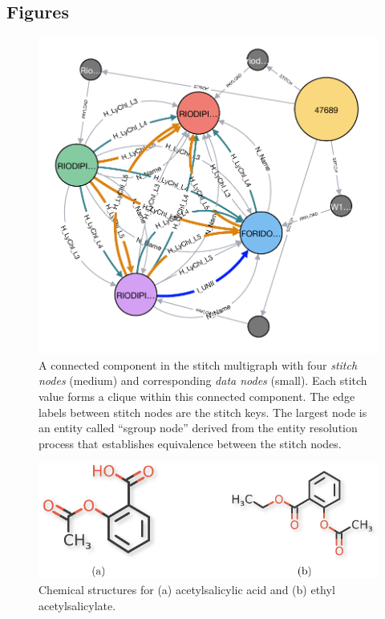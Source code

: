 \documentclass{bmcart}
\begin{document}
\begin{backmatter}


\section*{Figures}
\begin{figure}[ht!]
\caption{ A connected component in the
  stitch multigraph with four \emph{stitch nodes} (medium) and
  corresponding \emph{data nodes} (small). Each stitch value forms a
  clique within this connected component. The edge labels between
  stitch nodes are the stitch keys. 
  The largest node is an entity called ``sgroup node'' derived from the entity
  resolution process that establishes equivalence between the stitch 
  nodes.}\label{fig:graph1}
\centerline{\includegraphics[scale=0.5]{graph3}}
\end{figure}

\begin{figure}[!ht]
  \caption{Chemical structures for (a) acetylsalicylic acid and (b) ethyl
    acetylsalicylate.}\label{fig:aspirin} 
  \centerline{\includegraphics[scale=0.7]{aspirin-fig-crop}}
\end{figure}


\end{backmatter}
\end{document}
